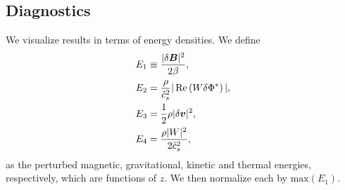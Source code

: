 \subsection{Diagnostics}
We visualize results in terms of energy densities. We define
\begin{align}
  &E_1 \equiv \frac{|\delta \bm{B}|^2}{2\beta},\\
  &E_2 = \frac{\rho}{\hat{c}_s^2}|\operatorname{Re}\left(W\delta \Phi^*\right)|,\\
  &E_3 = \frac{1}{2}\rho|\delta\bm{v}|^2,\\
  &E_4 = \frac{\rho|W|^2}{2\hat{c}_s^2},
\end{align}
as the perturbed magnetic, gravitational, kinetic and thermal
energies, respectively, which are functions of $z$. We
then normalize each by $\mathrm{max}(E_1)$. 
 

